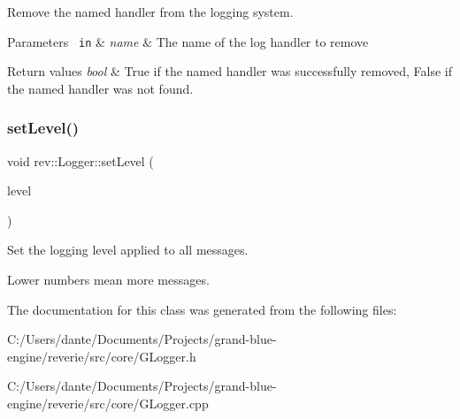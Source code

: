 Remove the named handler from the logging system. 


\begin{DoxyParams}[1]{Parameters}
\mbox{\texttt{ in}}  & {\em name} & The name of the log handler to remove \\
\hline
\end{DoxyParams}

\begin{DoxyRetVals}{Return values}
{\em bool} & True if the named handler was successfully removed, False if the named handler was not found. \\
\hline
\end{DoxyRetVals}
\mbox{\label{classrev_1_1_logger_a142e9c560c576f0fe3146db86a458a17}} 
\subsubsection{\texorpdfstring{setLevel()}{setLevel()}}
{\footnotesize\ttfamily void rev\+::\+Logger\+::set\+Level (\begin{DoxyParamCaption}\item[{Log\+Level}]{level }\end{DoxyParamCaption})\hspace{0.3cm}{\ttfamily [inline]}}



Set the logging level applied to all messages. 

Lower numbers mean more messages. 

The documentation for this class was generated from the following files\+:\begin{DoxyCompactItemize}
\item 
C\+:/\+Users/dante/\+Documents/\+Projects/grand-\/blue-\/engine/reverie/src/core/G\+Logger.\+h\item 
C\+:/\+Users/dante/\+Documents/\+Projects/grand-\/blue-\/engine/reverie/src/core/G\+Logger.\+cpp\end{DoxyCompactItemize}
